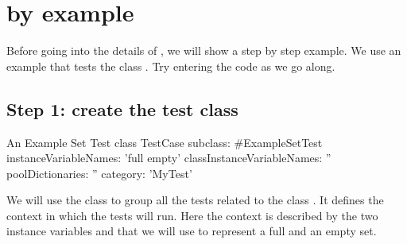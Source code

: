\documentclass[a4paper,10pt,twoside]{book}
\begin{document}



\section{\sunit by example}

Before going into the details of \SUnit, we will show a step by step
example.  We use an example that tests the class .  Try
entering the code as we go along.
\subsection{Step 1: create the test class}


\begin{classdef}[exampleSetTest]{An Example Set Test class}
TestCase subclass: #ExampleSetTest
	instanceVariableNames: 'full empty'
	classInstanceVariableNames: ''
    poolDictionaries: ''
	category: 'MyTest'
\end{classdef}


We will use the class  to group all the tests related to
the class .  It defines the context in which the tests
will run.  Here the context is described by
the two instance variables  and 
that we will use to represent a full and an empty set.
\end{document}
